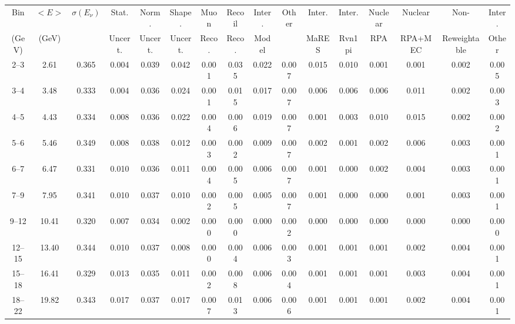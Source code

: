 \begin{turnpage}
\begin{table}[ptbh]
   \setlength{\tabcolsep}{3pt}
    \begin{tabular}{cccccc|cccc|cccccc}
    \hline
 Bin & $<E>$  & $\sigma(E_\nu)$ & 	 Stat.  & 	 Norm. & 	 Shape. & 	 Muon  & 	 Recoil  & 	 Inter.  & 	 Other & Inter. &  	 Inter. &  	 Nuclear &  	 Nuclear &  	 Non- &  	 Inter. \\
 (GeV) 	    &  (GeV) &                & 	Uncert.  & 	 Uncert. & 	 Uncert. 	& 	  Reco. & 	 Reco.  & 	  Model & 	 & MaRES &  Rvn1pi &  	 RPA &  	 RPA+MEC &  	 Reweightable & Other \\
    \hline
 2--3 & 	 2.61 & 	 0.365 &  	 0.004 &  	 0.039 &  	 0.042 &  	 0.001 &  	 0.035 &  	 0.022 &  	 0.007 &  	 0.015 &  	 0.010 &  	 0.001 &  	 0.001 &  	 0.002 &  	 0.005 \\ 
 3--4 & 	 3.48 & 	 0.333 &  	 0.004 &  	 0.036 &  	 0.024 &  	 0.001 &  	 0.015 &  	 0.017 &  	 0.007 &  	 0.006 &  	 0.006 &  	 0.006 &  	 0.011 &  	 0.002 &  	 0.003 \\ 
 4--5 & 	 4.43 & 	 0.334 &  	 0.008 &  	 0.036 &  	 0.022 &  	 0.004 &  	 0.006 &  	 0.019 &  	 0.007 &  	 0.001 &  	 0.003 &  	 0.010 &  	 0.015 &  	 0.002 &  	 0.002 \\ 
 5--6 & 	 5.46 &  	 0.349 &  	 0.008 &  	 0.038 &  	 0.012 &  	 0.003 &  	 0.002 &  	 0.009 &  	 0.007 &  	 0.002 &  	 0.001 &  	 0.002 &  	 0.006 &  	 0.003 &  	 0.001 \\ 
 6--7 & 	 6.47 & 	 0.331 &  	 0.010 &  	 0.036 &  	 0.011 &  	 0.004 &  	 0.005 &  	 0.006 &  	 0.007 &  	 0.001 &  	 0.000 &  	 0.002 &  	 0.004 &  	 0.003 &  	 0.001 \\ 
 7--9 & 	 7.95 & 	 0.341 &  	 0.010 &  	 0.037 &  	 0.010 &  	 0.002 &  	 0.005 &  	 0.005 &  	 0.007 &  	 0.001 &  	 0.000 &  	 0.000 &  	 0.001 &  	 0.003 &  	 0.001 \\ 
 9--12 & 	 10.41 & 	 0.320 &  	 0.007 &  	 0.034 &  	 0.002 &  	 0.000 &  	 0.000 &  	 0.000 &  	 0.002 &  	 0.000 &  	 0.000 &  	 0.000 &  	 0.000 &  	 0.000 &  	 0.000 \\ 
 12--15 & 	 13.40 &  	 0.344 &  	 0.010 &  	 0.037 &  	 0.008 &  	 0.000 &  	 0.004 &  	 0.006 &  	 0.003 &  	 0.001 &  	 0.001 &  	 0.001 &  	 0.002 &  	 0.004 &  	 0.001 \\ 
 15--18 & 	 16.41 & 	 0.329 &  	 0.013 &  	 0.035 &  	 0.011 &  	 0.002 &  	 0.008 &  	 0.006 &  	 0.004 &  	 0.001 &  	 0.001 &  	 0.001 &  	 0.003 &  	 0.004 &  	 0.001 \\ 
 18--22 & 	 19.82 & 	 0.343 &  	 0.017 &  	 0.037 &  	 0.017 &  	 0.007 &  	 0.013 &  	 0.006 &  	 0.006 &  	 0.001 &  	 0.001 &  	 0.001 &  	 0.002 &  	 0.004 &  	 0.001 \\ 

\end{tabular}
\end{table}
\end{turnpage}
